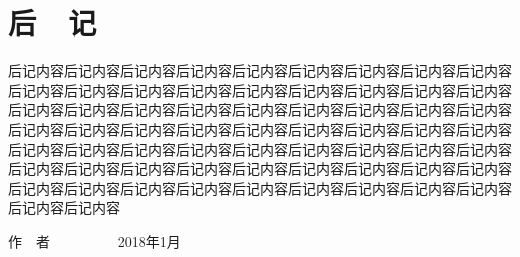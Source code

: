 \chapter{后~~记}
后记内容后记内容后记内容后记内容后记内容后记内容后记内容后记内容后记内容后记内容后记内容后记内容后记内容后记内容后记内容后记内容后记内容后记内容后记内容后记内容后记内容后记内容后记内容后记内容后记内容后记内容后记内容后记内容后记内容后记内容后记内容后记内容后记内容后记内容后记内容后记内容后记内容后记内容后记内容后记内容后记内容后记内容后记内容后记内容后记内容后记内容后记内容后记内容后记内容后记内容后记内容后记内容后记内容后记内容后记内容后记内容后记内容后记内容后记内容后记内容后记内容后记内容后记内容后记内容后记内容
\begin{flushright}
作~~者~~~~~~~~~
2018年1月~~~~~
\end{flushright}
